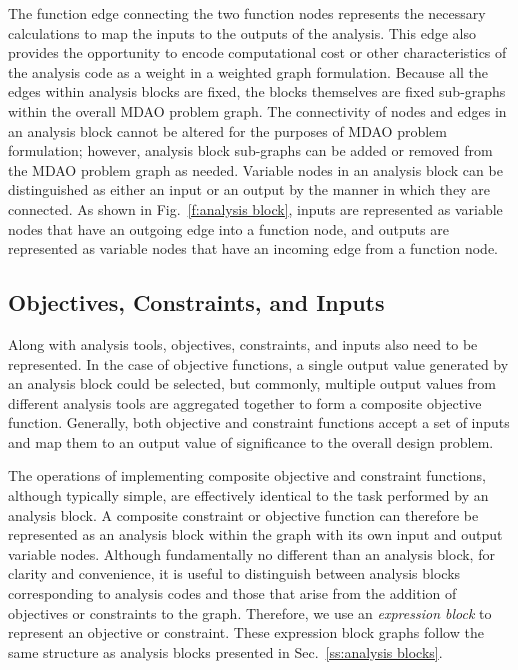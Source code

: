   The function edge connecting the two function nodes represents the necessary 
  calculations to map the inputs to the outputs of the analysis. 
  This edge also provides the opportunity to encode computational cost or other 
  characteristics of the analysis code as a weight in a weighted graph formulation. 
  Because all the edges within analysis blocks are fixed, the blocks themselves are fixed 
  sub-graphs within the overall MDAO problem graph. 
  The connectivity of nodes and edges in an analysis block cannot be altered for the 
  purposes of MDAO problem formulation; 
  however, analysis block sub-graphs can be added or removed from the MDAO problem 
  graph as needed. Variable nodes in an analysis block can be distinguished as either an 
  input or an output by the manner in which they are connected. As shown in 
  Fig.~\ref{f:analysis block}, inputs are represented as variable nodes that have an 
  outgoing edge into a function node, and outputs are represented as variable nodes that 
  have an incoming edge from a function node. 

\subsection{Objectives, Constraints, and Inputs}
  \label{ss:objectives and constraints}
  Along with analysis tools, objectives, constraints, and inputs also need to be represented.
  In the case of objective functions, a single output value generated by an analysis 
  block could be selected, but commonly, multiple output values from different analysis 
  tools are aggregated together to form a composite objective function. 
  Generally, both objective and constraint functions accept a set of inputs and map them 
  to an output value of significance to the overall design problem. 

  The operations of implementing composite objective and constraint functions, 
  although typically simple, are effectively identical to the task performed by an analysis block. 
  A composite constraint or objective function can therefore be represented as an 
  analysis block within the graph with its own input and output variable nodes. 
  Although fundamentally no different than an analysis block, for clarity and 
  convenience, it is useful to distinguish between analysis blocks corresponding to 
  analysis codes and those that arise from the addition of objectives or constraints to the graph. 
  Therefore, we use an \emph{expression block} to represent an objective or constraint. 
  These expression block graphs follow the same structure as analysis blocks 
  presented in Sec.~\ref{ss:analysis blocks}.

